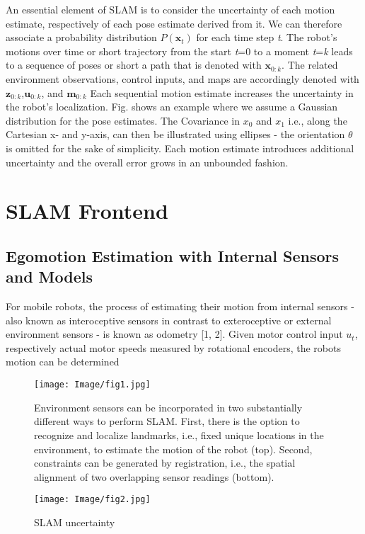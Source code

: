 \documentclass[english]{article}
\begin{document}
 An essential element of SLAM is to consider the uncertainty of each motion estimate, respectively of each pose estimate derived from it. We can therefore associate a probability distribution $P(\mathbf{x}_t)$ for each time step \textit{t}. The robot’s motions over time or short trajectory from the start \textit{t}=0 to a moment \textit{t}=\textit{k} leads to a sequence of poses or short a path that is denoted with $\mathbf{x}_{0:k}$. The related environment observations, control inputs, and maps are
accordingly denoted with $\mathbf{z}_{0:k}$,$\mathbf{u}_{0:k}$, and $\mathbf{m}_{0:k}$ Each sequential motion estimate increases the uncertainty in the robot’s localization. Fig.\cite{2} shows an example where we assume a Gaussian distribution for the pose estimates. The Covariance in $\mathit{x}_{0}$ and $\mathit{x}_{1}$ i.e., along the Cartesian x- and y-axis, can then be illustrated using ellipses - the
orientation $\theta$ is omitted for the sake of simplicity. Each motion estimate introduces additional uncertainty and the overall error grows in an unbounded fashion.

\section{SLAM Frontend}
\subsection{Egomotion Estimation with Internal Sensors and Models}
\noindent For mobile robots, the process of estimating their motion from internal sensors - also known as interoceptive sensors in contrast to exteroceptive or external environment sensors - is known as odometry [1, 2]. Given motor control input $\mathit{u_{t}}$, respectively actual motor speeds measured by rotational encoders, the robots motion can be determined 

\begin{figure}
    \centering
    \texttt{[image: Image/fig1.jpg]}
    \caption{Environment sensors can be incorporated in two substantially different ways to perform SLAM. First, there is the option to recognize and localize landmarks, i.e., fixed unique locations in the environment, to estimate the motion of the robot (top). Second, constraints can be generated by registration, i.e., the spatial alignment of two overlapping sensor readings (bottom).}
    \label{fig:1}
\end{figure}

\begin{figure}
    \centering
    \texttt{[image: Image/fig2.jpg]}
    \caption{SLAM uncertainty}
    \label{fig:2}
\end{figure}
\end{document}
